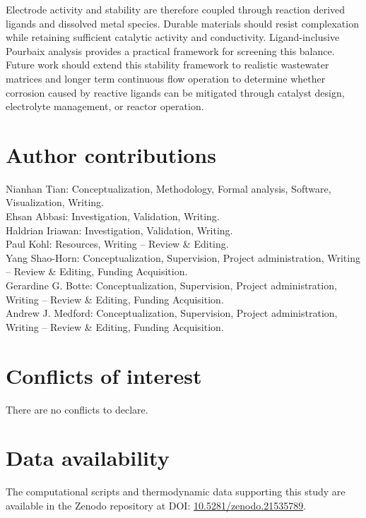 \documentclass[twoside,twocolumn,9pt]{article}
\begin{document}
Electrode activity and stability are therefore coupled through reaction derived ligands and dissolved metal species. Durable materials should resist complexation while retaining sufficient catalytic activity and conductivity. Ligand-inclusive Pourbaix analysis provides a practical framework for screening this balance. Future work should extend this stability framework to realistic wastewater matrices and longer term continuous flow operation to determine whether corrosion caused by reactive ligands can be mitigated through catalyst design, electrolyte management, or reactor operation.







\section*{Author contributions}
Nianhan Tian: Conceptualization, Methodology, Formal analysis, Software, Visualization, Writing.  \\
Ehsan Abbasi: Investigation, Validation, Writing.  \\
Haldrian Iriawan: Investigation, Validation, Writing.  \\
Paul Kohl: Resources, Writing -- Review \& Editing.  \\
Yang Shao-Horn: Conceptualization, Supervision, Project administration, Writing -- Review \& Editing, Funding Acquisition.  \\
Gerardine G. Botte: Conceptualization, Supervision, Project administration, Writing -- Review \& Editing, Funding Acquisition.  \\
Andrew J. Medford: Conceptualization, Supervision, Project administration, Writing -- Review \& Editing, Funding Acquisition. \\


\section*{Conflicts of interest}
There are no conflicts to declare.

\section*{Data availability}
The computational scripts and thermodynamic data supporting this study are available in the Zenodo repository at DOI: \href{https://doi.org/10.5281/zenodo.21535789}{10.5281/zenodo.21535789}.
\end{document}
